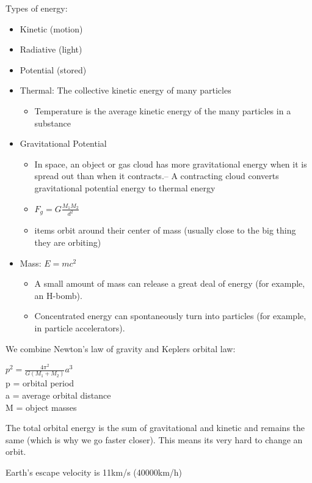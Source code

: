 \documentclass[12pt]{article}
\begin{document}
Types of energy:
\begin{itemize}
    \item Kinetic (motion)
    \item Radiative (light)
    \item Potential (stored)
    \item Thermal: The collective kinetic energy of many particles
    \begin{itemize}
        \item Temperature is the average kinetic energy of the many particles in a substance
    \end{itemize}
    \item Gravitational Potential
    \begin{itemize}
        \item In space, an object or gas cloud has more gravitational energy when it is spread out than when it contracts.– A contracting cloud converts gravitational potential energy to thermal energy
        \item $F_g = G\frac{M_1 M_2}{d^2}$
        \item items orbit around their center of mass (usually close to the big thing they are orbiting)
    \end{itemize}
    \item Mass: $E = mc^2$
    \begin{itemize}
        \item A small amount of mass can release a great deal of energy (for example, an H-bomb).
        \item Concentrated energy can spontaneously turn into particles (for example, in particle accelerators).
    \end{itemize}
\end{itemize}

We combine Newton's law of gravity and Keplers orbital law:\\
\begin{center}
    $p^2 = \frac{4\pi^2}{G(M_1 + M_2)}a^3$\\
    p = orbital period\\
    a = average orbital distance\\
    M = object masses
\end{center}

The total orbital energy is the sum of gravitational and kinetic and remains the same (which is why we go faster closer). This means its very hard to change an orbit.

Earth's escape velocity is 11km/s (40000km/h)
\end{document}
